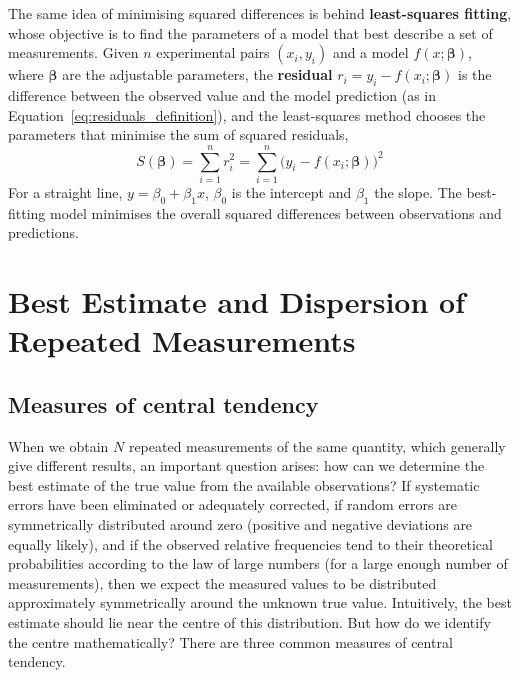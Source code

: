 \documentclass[letterpaper,11pt,leqno]{book}
\begin{document}
The same idea of minimising squared differences is behind \textbf{least-squares fitting}, whose objective is to find the parameters of a model that best describe a set of measurements. Given $n$ experimental pairs $(x_i, y_i)$ and a model $f(x;\boldsymbol{\beta})$, where $\boldsymbol{\beta}$ are the adjustable parameters, the \textbf{residual} $r_i = y_i - f(x_i;\boldsymbol{\beta})$ is the difference between the observed value and the model prediction (as in Equation~\eqref{eq:residuals_definition}), and the least-squares method chooses the parameters that minimise the sum of squared residuals,
\begin{equation}
\boxed{S(\boldsymbol{\beta}) = \sum_{i=1}^{n}r_i^2 = \sum_{i=1}^{n}\big(y_i - f(x_i;\boldsymbol{\beta})\big)^2}
\label{eq:least_squares}
\end{equation}
For a straight line, $y = \beta_0 + \beta_1x$, $\beta_0$ is the intercept and $\beta_1$ the slope. The best-fitting model minimises the overall squared differences between observations and predictions.

\section{Best Estimate and Dispersion of Repeated Measurements}
\label{sec:best_estimate}

\subsection{Measures of central tendency}

When we obtain $N$ repeated measurements of the same quantity, which generally give different results, an important question arises: how can we determine the best estimate of the true value from the available observations? If systematic errors have been eliminated or adequately corrected, if random errors are symmetrically distributed around zero (positive and negative deviations are equally likely), and if the observed relative frequencies tend to their theoretical probabilities according to the law of large numbers (for a large enough number of measurements), then we expect the measured values to be distributed approximately symmetrically around the unknown true value. Intuitively, the best estimate should lie near the centre of this distribution. But how do we identify the centre mathematically? There are three common measures of central tendency.
\end{document}
